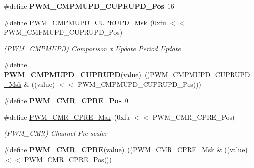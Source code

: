 \begin{DoxyCompactItemize}
\item 
\mbox{\label{group__SAME70__PWM_ga215cfa6f967c8c69cb03500156c783e3}} 
\#define {\bfseries P\+W\+M\+\_\+\+C\+M\+P\+M\+U\+P\+D\+\_\+\+C\+U\+P\+R\+U\+P\+D\+\_\+\+Pos}~16
\item 
\mbox{\label{group__SAME70__PWM_ga54677fe388d0a3e54a38a078f36137bf}} 
\#define \mbox{\hyperlink{group__SAME70__PWM_ga54677fe388d0a3e54a38a078f36137bf}{P\+W\+M\+\_\+\+C\+M\+P\+M\+U\+P\+D\+\_\+\+C\+U\+P\+R\+U\+P\+D\+\_\+\+Msk}}~(0xfu $<$$<$ P\+W\+M\+\_\+\+C\+M\+P\+M\+U\+P\+D\+\_\+\+C\+U\+P\+R\+U\+P\+D\+\_\+\+Pos)
\begin{DoxyCompactList}\small\item\em (P\+W\+M\+\_\+\+C\+M\+P\+M\+U\+PD) Comparison x Update Period Update \end{DoxyCompactList}\item 
\mbox{\label{group__SAME70__PWM_ga62488dad3ad02edd4b9f10186f329f91}} 
\#define {\bfseries P\+W\+M\+\_\+\+C\+M\+P\+M\+U\+P\+D\+\_\+\+C\+U\+P\+R\+U\+PD}(value)~((\mbox{\hyperlink{group__SAMV71__PWM_ga54677fe388d0a3e54a38a078f36137bf}{P\+W\+M\+\_\+\+C\+M\+P\+M\+U\+P\+D\+\_\+\+C\+U\+P\+R\+U\+P\+D\+\_\+\+Msk}} \& ((value) $<$$<$ P\+W\+M\+\_\+\+C\+M\+P\+M\+U\+P\+D\+\_\+\+C\+U\+P\+R\+U\+P\+D\+\_\+\+Pos)))
\item 
\mbox{\label{group__SAME70__PWM_ga5badf58a9dad60e51cc93b3bd3b50857}} 
\#define {\bfseries P\+W\+M\+\_\+\+C\+M\+R\+\_\+\+C\+P\+R\+E\+\_\+\+Pos}~0
\item 
\mbox{\label{group__SAME70__PWM_gaa7cd448e4b8d4338768b6d3c01087a35}} 
\#define \mbox{\hyperlink{group__SAME70__PWM_gaa7cd448e4b8d4338768b6d3c01087a35}{P\+W\+M\+\_\+\+C\+M\+R\+\_\+\+C\+P\+R\+E\+\_\+\+Msk}}~(0xfu $<$$<$ P\+W\+M\+\_\+\+C\+M\+R\+\_\+\+C\+P\+R\+E\+\_\+\+Pos)
\begin{DoxyCompactList}\small\item\em (P\+W\+M\+\_\+\+C\+MR) Channel Pre-\/scaler \end{DoxyCompactList}\item 
\mbox{\label{group__SAME70__PWM_gae06e7defd2dba13c0fff86d6496e86bd}} 
\#define {\bfseries P\+W\+M\+\_\+\+C\+M\+R\+\_\+\+C\+P\+RE}(value)~((\mbox{\hyperlink{group__SAMV71__PWM_gaa7cd448e4b8d4338768b6d3c01087a35}{P\+W\+M\+\_\+\+C\+M\+R\+\_\+\+C\+P\+R\+E\+\_\+\+Msk}} \& ((value) $<$$<$ P\+W\+M\+\_\+\+C\+M\+R\+\_\+\+C\+P\+R\+E\+\_\+\+Pos)))

\end{DoxyCompactItemize}
